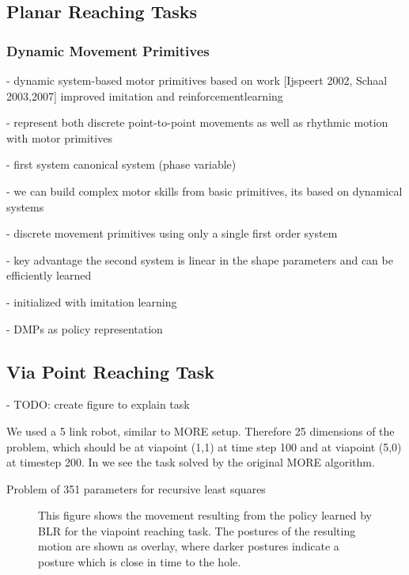 \subsection{Planar Reaching Tasks}
\subsubsection{Dynamic Movement Primitives}
- dynamic system-based motor primitives based on work [Ijspeert 2002, Schaal 2003,2007]
improved imitation and reinforcementlearning

- represent both discrete point-to-point movements as well as rhythmic motion
with motor primitives

- first system canonical system (phase variable)

- we can build complex motor skills from basic primitives,
  its based on dynamical systems

- discrete movement primitives using only a single first order system

- key advantage the second system is linear in the shape parameters and can
  be efficiently learned

- initialized with imitation learning

- DMPs as policy representation

\subsection{Via Point Reaching Task}
- TODO: create figure to explain task

We used a 5 link robot, similar to MORE setup.
Therefore 25 dimensions of the problem, which should be at viapoint (1,1)
at time step 100 and at viapoint (5,0) at timestep 200.
In  we see the task solved by the original MORE algorithm.

Problem of 351 parameters for recursive least squares

\begin{figure}[ht!]
  \centering
     
     \hspace{1cm}                       
     \caption{This figure shows the movement resulting from the policy
       learned by BLR for the viapoint reaching task.
       The postures of the resulting motion are shown as overlay,
       where darker postures indicate a posture which
       is close in time to the hole.}
     \label{fig:blr_via}  
\end{figure}

